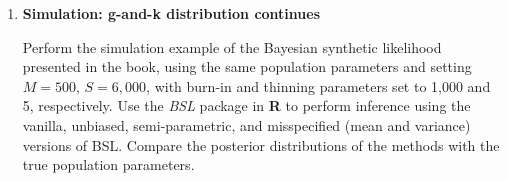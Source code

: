 \begin{enumerate}
%	
%	
%	
%	
	\item \textbf{Simulation: g-and-k distribution continues}
	
	Perform the simulation example of the Bayesian synthetic likelihood presented in the book, using the same population parameters and setting $M=500$, $S=6{,}000$, with burn-in and thinning parameters set to 1,000 and 5, respectively. Use the \textit{BSL} package in \textbf{R} to perform inference using the vanilla, unbiased, semi-parametric, and misspecified (mean and variance) versions of BSL. Compare the posterior distributions of the methods with the true population parameters. 


\end{enumerate}

